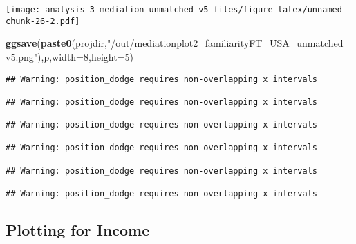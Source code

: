 \documentclass[
]{article}
\newenvironment{Shaded}{\begin{snugshade}}{\end{snugshade}}
\newcommand{\DataTypeTok}[1]{\textcolor[rgb]{0.13,0.29,0.53}{#1}}
\newcommand{\DecValTok}[1]{\textcolor[rgb]{0.00,0.00,0.81}{#1}}
\newcommand{\KeywordTok}[1]{\textcolor[rgb]{0.13,0.29,0.53}{\textbf{#1}}}
\newcommand{\NormalTok}[1]{#1}
\newcommand{\StringTok}[1]{\textcolor[rgb]{0.31,0.60,0.02}{#1}}
\begin{document}
\texttt{[image: analysis\_3\_mediation\_unmatched\_v5\_files/figure-latex/unnamed-chunk-26-2.pdf]}

\begin{Shaded}
\begin{Highlighting}[]
\KeywordTok{ggsave}\NormalTok{(}\KeywordTok{paste0}\NormalTok{(projdir,}\StringTok{"/out/mediationplot2_familiarityFT_USA_unmatched_v5.png"}\NormalTok{),p,}\DataTypeTok{width=}\DecValTok{8}\NormalTok{,}\DataTypeTok{height=}\DecValTok{5}\NormalTok{)}
\end{Highlighting}
\end{Shaded}

\begin{verbatim}
## Warning: position_dodge requires non-overlapping x intervals

## Warning: position_dodge requires non-overlapping x intervals

## Warning: position_dodge requires non-overlapping x intervals

## Warning: position_dodge requires non-overlapping x intervals

## Warning: position_dodge requires non-overlapping x intervals

## Warning: position_dodge requires non-overlapping x intervals
\end{verbatim}

\hypertarget{plotting-for-income}{%
\subsection{Plotting for Income}\label{plotting-for-income}}
\end{document}
